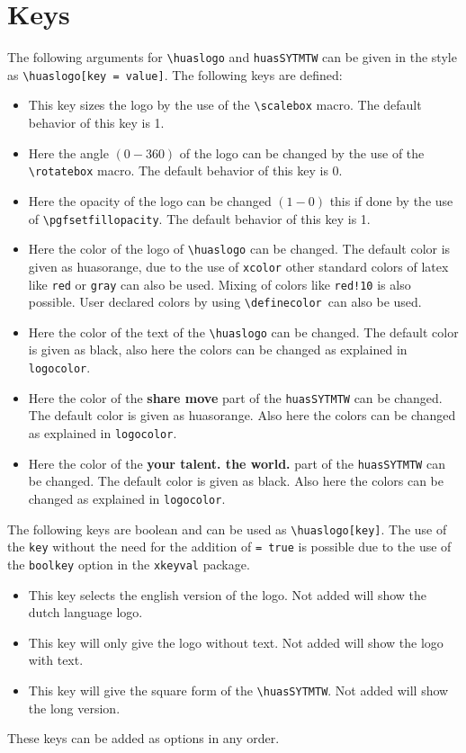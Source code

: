 \documentclass{ltxdoc}
\begin{document}
\section{Keys}

The following arguments for \verb|\huaslogo| and \verb|huasSYTMTW| can be given in the style as \verb|\huaslogo[key = value]|. The following keys are defined:
\begin{itemize}
    \item [\verb|scale|:] This key sizes the logo by the use of the \verb|\scalebox| macro. The default behavior of this key is 1.
    \item [\verb|rotate|:] Here the angle $(0 - 360)$ of the logo can be changed by the use of the \verb|\rotatebox| macro. The default behavior of this key is 0.
    \item [\verb|opacity|:] Here the opacity of the logo can be changed $(1 - 0)$ this if done by the use of \verb|\pgfsetfillopacity|. The default behavior of this key is 1.
    \item [\verb|logocolor|:] Here the color of the logo of \verb|\huaslogo| can be changed. The default color is given as huasorange, due to the use of \verb|xcolor| other standard colors of latex like \verb|red| or \verb|gray| can also be used. Mixing of colors like \verb|red!10| is also possible. User declared colors by using \verb|\definecolor|\ can also be used.   
    \item [\verb|textcolor|:] Here the color of the text of the \verb|\huaslogo| can be changed. The default color is given as black, also here the colors can be changed as explained in \verb|logocolor|.
    \item [\verb|SMcolor|:] Here the color of the \textbf{share move} part of the \verb|huasSYTMTW| can be changed. The default color is given as huasorange. Also here the colors can be changed as explained in \verb|logocolor|. 
    \item [\verb|YTTWcolor|:] Here the color of the \textbf{your talent. the world.} part of the \verb|huasSYTMTW| can be changed. The default color is given as black. Also here the colors can be changed as explained in \verb|logocolor|. 
\end{itemize}
The following keys are boolean and can be used as \verb|\huaslogo[key]|. The use of the \verb|key| without the need for the addition of \verb|= true| is possible due to the use of the \verb|boolkey| option in the \verb|xkeyval| package. 
\begin{itemize}
    \item [\verb|EN|:] This key selects the english version of the logo. Not added will show the dutch language logo.
    \item [\verb|onlylogo|:] This key will only give the logo without text. Not added will show the logo with text.
    \item [\verb|square|:] This key will give the square form of the \verb|\huasSYTMTW|. Not added will show the long version.
\end{itemize}
These keys can be added as options in any order.
\clearpage
\end{document}
